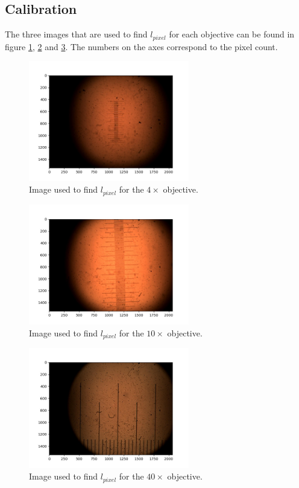 \subsection{Calibration}
\label{appendix_calibration}

The three images that are used to find $l_{pixel}$ for each objective can be found in figure \ref{fig_pixelsize_4x}, \ref{fig_pixelsize_10x} and \ref{fig_pixelsize_40x}. The numbers on the axes correspond to the pixel count.

\begin{figure}[h!]
    \centering
    \includegraphics[width=7cm]{afbeeldingen/pixelsize/pixelsize_4x.jpg}
    \captionsetup{font=small, justification = centering}
    \caption{Image used to find $l_{pixel}$ for the $4\times$ objective.}
    \label{fig_pixelsize_4x}
\end{figure}

\begin{figure}[h!]
    \centering
    \includegraphics[width=7cm]{afbeeldingen/pixelsize/pixelsize_10x.jpg}
    \captionsetup{font=small, justification = centering}
    \caption{Image used to find $l_{pixel}$ for the $10\times$ objective.}
    \label{fig_pixelsize_10x}
\end{figure}

\begin{figure}[h!]
    \centering
    \includegraphics[width=7cm]{afbeeldingen/pixelsize/pixelsize_40x.jpg}
    \captionsetup{font=small, justification = centering}
    \caption{Image used to find $l_{pixel}$ for the $40\times$ objective.}
    \label{fig_pixelsize_40x}
\end{figure}
